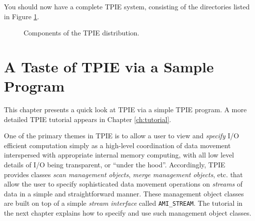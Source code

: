 You should now have a complete TPIE system, consisting of
the directories listed in Figure \ref{fig:components}.
\begin{figure}
\begin{center}
\begin{minipage}[hb]{1.0\linewidth}
\raggedright
{}
\caption{\label{fig:components} Components of the TPIE distribution.}
\end{minipage}
\end{center}
\end{figure}



\chapter{A Taste of TPIE via a Sample Program}
\label{ch:samplepgmr}

This chapter presents a quick look
at TPIE via a simple TPIE program. A more detailed TPIE
tutorial appears in Chapter \ref{ch:tutorial}. 

One of the primary themes in TPIE is to allow a user to view
and \emph{specify} I/O efficient computation simply as a
high-level coordination of data movement interspersed with
appropriate internal memory computing, with all low level
details of I/O being transparent, or ``under the hood''.
Accordingly, TPIE provides classes \emph{scan management
   objects}, \emph{merge management objects}, etc. that
allow the user to specify sophisticated data movement
operations on \emph{streams} of data in a simple and
straightforward manner. These management object classes are
built on top of a simple \emph{stream interface} called
\verb|AMI_STREAM|. The tutorial in the next chapter explains
how to specify and use such management object classes.

